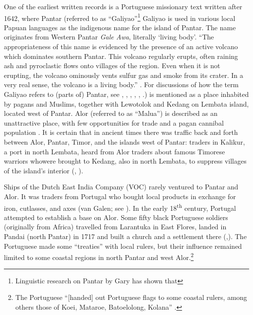 One of the earliest written records is a Portuguese missionary text written after 1642, where Pantar (referred to as ``Galiyao''\footnote{Linguistic research on Pantar by Gary \citet{Holton2010b} has shown that} Galiyao is used in various local Papuan languages as the indigenous name for the island of Pantar. The name originates from Western Pantar \textit{Gale Awa}, literally `living body'{.}
 { ``}{The appropriateness of this name is evidenced by the presence of an active volcano which dominates southern Pantar. This volcano regularly erupts, often raining ash and pyroclastic flows onto villages of the region. Even when it is not erupting, the volcano ominously vents sulfur gas and smoke from its crater. In a very real sense, the volcano is a living body.'' \citep{Holton2010}.}
{For discussions of how the term Galiyao refers to (parts of) Pantar, see \citet[47]{LeRoux1929}, \citet[407]{Barnes1982}, \citet{Dietrich1984}, \citet{Rodemeier1995}, \citet[277]{Barnes2001}, \citet{Rodemeier2006}.}) is mentioned as a place inhabited by pagans and Muslims, together with Lewotolok and Kedang on Lembata island, located west of Pantar. Alor (referred to as ``Malua'') is described as an unattractive place, with few opportunities for trade and a pagan cannibal population \citep[101]{Hagerdal2012}. It is certain that in ancient times there was traffic back and forth between Alor, Pantar, Timor, and the islands west of Pantar: traders in Kalikur, a port in north Lembata, heard from Alor traders about famous Timorese warriors whowere brought to Kedang, also in north Lembata, to suppress villages of the island's interior (\citet[10.12]{Barnes1974}, \citet[14]{LeRoux1929}).

Ships of the Dutch East India Company (VOC) rarely ventured to Pantar and Alor. It was traders from Portugal who bought local products in exchange for iron, cutlasses, and axes (van Galen; see \citet[17]{Hagerdal2010}). In the early 18\textsuperscript{th} century, Portugal attempted to establish a base on Alor. Some fifty black Portuguese soldiers (originally from Africa) travelled from Larantuka in East Flores, landed in Pandai (north Pantar) in 1717 and built a church and a settlement there (\citep[297]{Coolhaas1979},\citet[78]{Rodemeier2006}). The Portuguese made some ``treaties'' with local rulers, but their influence remained limited to some coastal regions in north Pantar and west Alor.\footnote{The Portuguese ``[handed] out Portuguese flags to some coastal rulers, among others those of Koei, Mataroe, Batoelolong, Kolana'' \citep[2]{VanGaalen1945}.}


